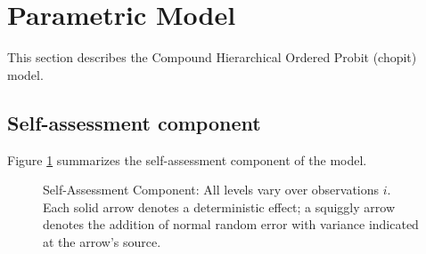 \documentclass{amsart}
\begin{document}
\section{Parametric Model}

\noindent
This section describes the Compound Hierarchical Ordered Probit
(chopit) model.

\subsection{Self-assessment component}

Figure \ref{f:self} summarizes the self-assessment component of the
model.
\begin{figure}[t]
  \begin{center}
    \caption{\label{f:self}Self-Assessment Component: All levels vary
      over observations $i$.  Each solid arrow denotes a deterministic
      effect; a squiggly arrow denotes the addition of normal random
      error with variance indicated at the arrow's source.}
  \end{center}
\end{figure}
\end{document}
